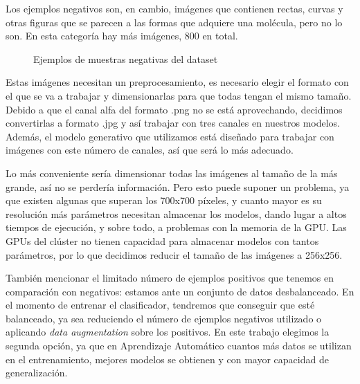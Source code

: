 Los ejemplos negativos son, en cambio, imágenes que contienen rectas, curvas y otras figuras que se parecen a las formas que adquiere una molécula, pero no lo son. En esta categoría hay más imágenes, 800 en total.

\begin{figure}[H]
\centering
    \caption{Ejemplos de muestras negativas del dataset} 
\end{figure}

Estas imágenes necesitan un preprocesamiento, es necesario elegir el formato con el que se va a trabajar y dimensionarlas para que todas tengan el mismo tamaño. Debido a que el canal alfa del formato .png no se está aprovechando, decidimos convertirlas a formato .jpg y así trabajar con tres canales en nuestros modelos. Además, el modelo generativo que utilizamos está diseñado para trabajar con imágenes con este número de canales, así que será lo más adecuado.

Lo más conveniente sería dimensionar todas las imágenes al tamaño de la más grande, así no se perdería información. Pero esto puede suponer un problema, ya que existen algunas que superan los 700x700 píxeles, y cuanto mayor es su resolución más parámetros necesitan almacenar los modelos, dando lugar a altos tiempos de ejecución, y sobre todo, a problemas con la memoria de la GPU. Las GPUs del clúster no tienen capacidad para almacenar modelos con tantos parámetros, por lo que decidimos reducir el tamaño de las imágenes a 256x256. 

También mencionar el limitado número de ejemplos positivos que tenemos en comparación con negativos: estamos ante un conjunto de datos desbalanceado. En el momento de entrenar el clasificador, tendremos que conseguir que esté balanceado, ya sea reduciendo el número de ejemplos negativos utilizado o aplicando \textit{data augmentation} sobre los positivos. En este trabajo elegimos la segunda opción, ya que en Aprendizaje Automático cuantos más datos se utilizan en el entrenamiento, mejores modelos se obtienen y con mayor capacidad de generalización. 

